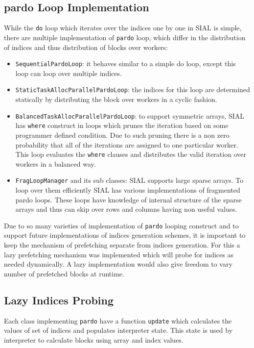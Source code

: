 \subsection{pardo Loop Implementation}
While the \texttt{do} loop which iterates over the indices one by one in SIAL is
simple, there are multiple implementation of \texttt{pardo} loop, which differ
in the distribution of indices and thus distribution of blocks over workers:
\begin{itemize}
\item \texttt{SequentialPardoLoop}: it behaves similar to a simple do loop,
  except this loop can loop over multiple indices.
\item \texttt{StaticTaskAllocParallelPardoLoop}: the indices for this loop are
  determined statically by distributing the block over workers in a cyclic fashion.
\item \texttt{BalancedTaskAllocParallelPardoLoop}: to support symmetric arrays,
  SIAL has \texttt{where} construct in loops which prunes the iteration based on
  some programmer defined condition. Due to such pruning there is a non zero
  probability that all of the iterations are assigned to one particular worker.
  This loop evaluates the \texttt{where} clauses and distributes the valid iteration
  over workers in a balanced way.
\item \texttt{FragLoopManager} and its sub classes: SIAL supports large sparse
  arrays. To loop over them efficiently SIAL has various implementations of
  fragmented pardo loops. These loops have knowledge of internal structure of the
  sparse arrays and thus can skip over rows and columns having non useful values.
\end{itemize}
Due to so many varieties of implementation of \texttt{pardo} looping construct
and to support future implementations of indices generation schemes, it is
important to keep the mechanism of prefetching separate from indices generation.
For this a lazy prefetching mechanism was implemented which will probe for indices
as needed dynamically. A lazy implementation would also give freedom to vary number
of prefetched blocks at runtime.

\subsection{Lazy Indices Probing}
Each class implementing \texttt{pardo} have a function \texttt{update} which
calculates the values of set of indices and populates interpreter state. This
state is used by interpreter to calculate blocks using array and index values.

